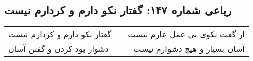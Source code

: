 \begin{center}
\section*{رباعی شماره ۱۴۷: گفتار نکو دارم و کردارم نیست}
\label{sec:sh147}
\begin{longtable}{l p{0.5cm} r}
گفتار نکو دارم و کردارم نیست
&&
از گفت نکوی بی عمل عارم نیست
\\
دشوار بود کردن و گفتن آسان
&&
آسان بسیار و هیچ دشوارم نیست
\\
\end{longtable}
\end{center}

